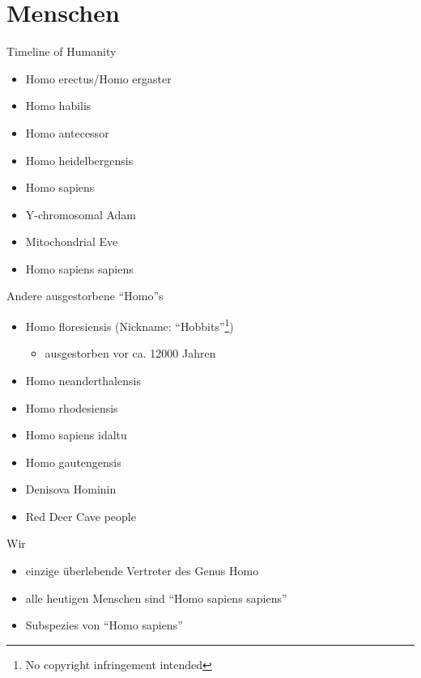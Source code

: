 \documentclass{beamer}
\begin{document}
	\section{Menschen}
	\begin{frame}{Timeline of Humanity}
		\begin{itemize}
			\item Homo erectus/Homo ergaster
			\item Homo habilis
			\item Homo antecessor
			\item Homo heidelbergensis
			\item Homo sapiens
			\item Y-chromosomal Adam			
			\item Mitochondrial Eve
			\item Homo sapiens sapiens
		\end{itemize}
	\end{frame}
	
	\begin{frame}{Andere ausgestorbene "`Homo"'s}
		\begin{itemize}
			\item Homo floresiensis (Nickname: "`Hobbits"'\footnote{No copyright infringement intended})
			\begin{itemize}
				\item ausgestorben vor ca. 12000 Jahren
			\end{itemize}			
			\item Homo neanderthalensis
			\item Homo rhodesiensis
			\item Homo sapiens idaltu
			\item Homo gautengensis
			\item Denisova Hominin
			\item Red Deer Cave people
		\end{itemize}
	\end{frame}
	
	\begin{frame}{Wir}
		\begin{itemize}
			\item einzige überlebende Vertreter des Genus Homo
			\item alle heutigen Menschen sind "`Homo sapiens sapiens"'
			\item Subspezies von "`Homo sapiens"'
		\end{itemize}
	\end{frame}
	
\end{document}
